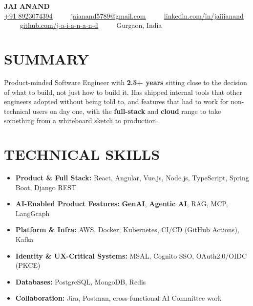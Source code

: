 \documentclass[letterpaper,10pt]{article}
\renewcommand{\normalsize}{%
  \fontsize{10.1}{12.25}\selectfont
}
\begin{document}
\begin{center}
    {\Huge \textbf{JAI ANAND}} \\ \vspace{4pt}
    \small
    \href{tel:+918923074394}{\underline{+91 8923074394}} ~~\textbullet~~ 
    \href{mailto:jaianand5789@gmail.com}{\underline{jaianand5789@gmail.com}} ~~\textbullet~~ 
    \href{https://linkedin.com/in/jaiiianand/}{\underline{linkedin.com/in/jaiiianand}} ~~\textbullet~~ 
    \href{https://github.com/j-a-i-a-n-a-n-d}{\underline{github.com/j-a-i-a-n-a-n-d}} ~~\textbullet~~
    Gurgaon, India
\end{center}

\section{SUMMARY}
Product-minded Software Engineer with \textbf{2.5+ years} sitting close to the decision of what to build, not just how to build it. Has shipped internal tools that other engineers adopted without being told to, and features that had to work for non-technical users on day one, with the \textbf{full-stack} and \textbf{cloud} range to take something from a whiteboard sketch to production.

\section{TECHNICAL SKILLS}
  \begin{itemize}[leftmargin=0.0in, label={}, itemsep=1pt, parsep=0pt, topsep=0pt]
    \item \normalsize{
     \textbf{\normalsize Product \& Full Stack:}{ React, Angular, Vue.js, Node.js, TypeScript, Spring Boot, Django REST}
    }
    \item \normalsize{
     \textbf{\normalsize AI-Enabled Product Features:}{ \textbf{GenAI}, \textbf{Agentic AI}, RAG, MCP, LangGraph}
    }
    \item \normalsize{
     \textbf{\normalsize Platform \& Infra:}{ AWS, Docker, Kubernetes, CI/CD (GitHub Actions), Kafka}
    }
    \item \normalsize{
     \textbf{\normalsize Identity \& UX-Critical Systems:}{ MSAL, Cognito SSO, OAuth2.0/OIDC (PKCE)}
    }
    \item \normalsize{
     \textbf{\normalsize Databases:}{ PostgreSQL, MongoDB, Redis}
    }
    \item \normalsize{
     \textbf{\normalsize Collaboration:}{ Jira, Postman, cross-functional AI Committee work}
    }
  \end{itemize}
\end{document}
